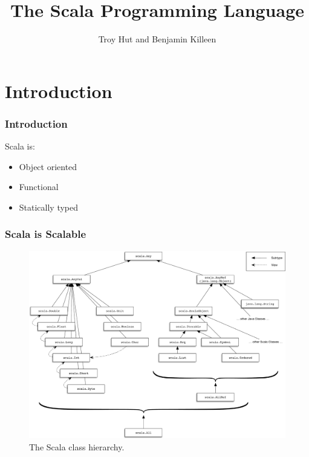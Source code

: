 \documentclass[10pt, usenames, dvipsnames, table]{beamer}
\title{The Scala Programming Language}
\author{Troy Hut and Benjamin Killeen}
\date{}
\begin{document}
\begin{frame}
  \titlepage{}
\end{frame}

\section{Introduction}
\begin{frame}
  \frametitle{Introduction}
  Scala is:
  \begin{itemize}
  \item<2-> Object oriented
  \item<3-> Functional
  \item<4-> Statically typed
  \end{itemize}
\end{frame}

\begin{frame}
  \frametitle{Scala is \textbf{Scalable}}
  \begin{figure}
    \centering
    \includegraphics[width=0.8\linewidth]{scala_classes}
    \caption{The Scala class hierarchy.}
    \label{fig:class_hierarchy}
  \end{figure}
\end{frame}
\end{document}
